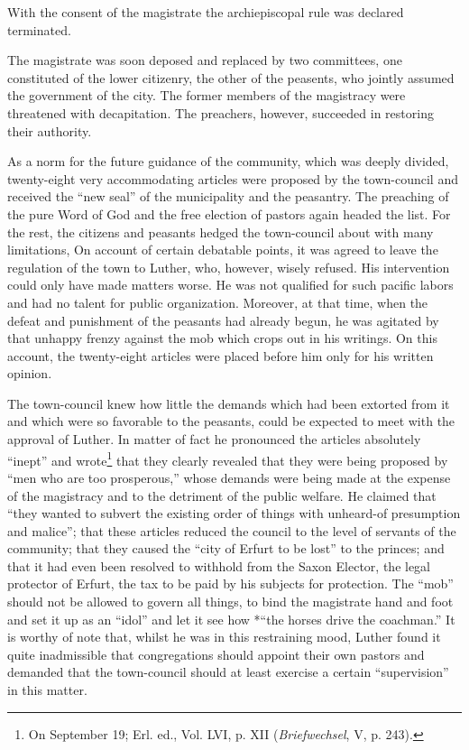 With the consent of the magistrate the archiepiscopal rule was
declared terminated.

The magistrate was soon deposed and replaced by two committees,
one constituted of the lower citizenry, the other of the peasents, who
jointly assumed the government of the city. The former members of
the magistracy were threatened with decapitation. The preachers,
however, succeeded in restoring their authority.

As a norm for the future guidance of the community, which
was deeply divided, twenty-eight very accommodating articles were
proposed by the town-council and received the “new seal” of the
municipality and the peasantry. The preaching of the pure Word
of God and the free election of pastors again headed the list. For
the rest, the citizens and peasants hedged the town-council about
with many limitations, On account of certain debatable points, it
was agreed to leave the regulation of the town to Luther, who,
however, wisely refused. His intervention could only have made
matters worse. He was not qualified for such pacific labors and
had no talent for public organization. Moreover, at that time,
when the defeat and punishment of the peasants had already begun, he
was agitated by that unhappy frenzy against the mob which crops
out in his writings. On this account, the twenty-eight articles were
placed before him only for his written opinion.

The town-council knew how little the demands which had been
extorted from it and which were so favorable to the peasants, could
be expected to meet with the approval of Luther. In matter of
fact he pronounced the articles absolutely “inept” and wrote\footnote
{On September 19; Erl. ed., Vol. LVI, p. XII (\textit{Briefwechsel}, V, p. 243).}
that they clearly revealed that they were being proposed by “men
who are too prosperous,” whose demands were being made at the
expense of the magistracy and to the detriment of the public welfare.
He claimed that “they wanted to subvert the existing order
of things with unheard-of presumption and malice”; that these
articles reduced the council to the level of servants of the community;
that they caused the “city of Erfurt to be lost” to the
princes; and that it had even been resolved to withhold from the
Saxon Elector, the legal protector of Erfurt, the tax to be paid by his
subjects for protection. The “mob” should not be allowed to govern
all things, to bind the magistrate hand and foot and set it up as
an “idol” and let it see how *“the horses drive the coachman.” It
is worthy of note that, whilst he was in this restraining mood, Luther
found it quite inadmissible that congregations should appoint their
own pastors and demanded that the town-council should at least
exercise a certain “supervision” in this matter.

